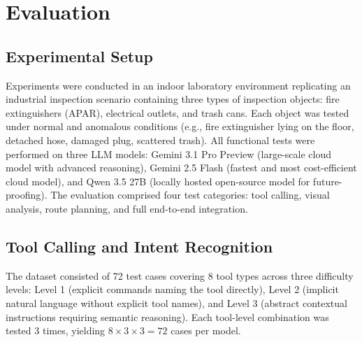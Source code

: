 \documentclass[conference]{IEEEtran}
\begin{document}
\section{Evaluation}

\subsection{Experimental Setup}
Experiments were conducted in an indoor laboratory environment replicating an industrial inspection scenario containing three types of inspection objects: fire extinguishers (APAR), electrical outlets, and trash cans. Each object was tested under normal and anomalous conditions (e.g., fire extinguisher lying on the floor, detached hose, damaged plug, scattered trash). All functional tests were performed on three LLM models: Gemini 3.1 Pro Preview (large-scale cloud model with advanced reasoning), Gemini 2.5 Flash (fastest and most cost-efficient cloud model), and Qwen 3.5 27B (locally hosted open-source model for future-proofing). The evaluation comprised four test categories: tool calling, visual analysis, route planning, and full end-to-end integration.

\subsection{Tool Calling and Intent Recognition}
The dataset consisted of 72 test cases covering 8 tool types across three difficulty levels: Level 1 (explicit commands naming the tool directly), Level 2 (implicit natural language without explicit tool names), and Level 3 (abstract contextual instructions requiring semantic reasoning). Each tool-level combination was tested 3 times, yielding $8 \times 3 \times 3 = 72$ cases per model.

\begin{table}[htbp]
\caption{Summary of Tool Calling Evaluation}
\label{tab:eval_tools}
\centering
{}
\end{table}
\end{document}
